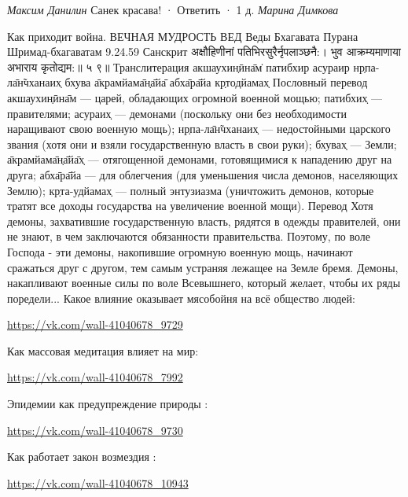 \begin{itemize}
\emph{Максим Данилин}
Санек красава!
 · Ответить · 1 д.
\emph{Марина Димкова}

\obeycr
Как приходит война.
ВЕЧНАЯ МУДРОСТЬ ВЕД
Веды Бхагавата Пурана Шримад-бхагаватам 9.24.59
Санскрит
अक्षौहिणीनां पतिभिरसुरैर्नृपलाञ्छनै:। भुव आक्रम्यमाणाया अभाराय कृतोद्यम:॥ ५ ९॥
Транслитерация
акшаухин̣ӣна̄м̇ патибхир
асураир нр̣па-ла̄н̃чханаих̣
бхува а̄крамйама̄н̣а̄йа̄
абха̄ра̄йа кр̣тодйамах̣
Пословный перевод
акшаухин̣ӣна̄м — царей, обладающих огромной военной мощью; патибхих̣ — правителями; асураих̣ — демонами (поскольку они без необходимости наращивают свою военную мощь); нр̣па-ла̄н̃чханаих̣ — недостойными царского звания (хотя они и взяли государственную власть в свои руки); бхувах̣ — Земли; а̄крамйама̄н̣а̄йа̄х̣ — отягощенной демонами, готовящимися к нападению друг на друга; абха̄ра̄йа — для облегчения (для уменьшения числа демонов, населяющих Землю); кр̣та-удйамах̣ — полный энтузиазма (уничтожить демонов, которые тратят все доходы государства на увеличение военной мощи).
\smallskip
Перевод
\smallskip
Хотя демоны, захватившие государственную власть, рядятся в одежды правителей,
они не знают, в чем заключаются обязанности правительства. Поэтому, по воле
Господа - эти демоны, накопившие огромную военную мощь, начинают сражаться друг
с другом, тем самым устраняя лежащее на Земле бремя.
\smallskip
Демоны, накапливают военные силы по воле Всевышнего, который желает, чтобы их
ряды поредели...
\smallskip
Какое влияние оказывает мясобойня на всё общество людей:
\restorecr

\url{https://vk.com/wall-41040678_9729}

Как массовая медитация влияет на мир:

\url{https://vk.com/wall-41040678_7992}

Эпидемии как предупреждение природы :

\url{https://vk.com/wall-41040678_9730}

Как работает закон возмездия :

\url{https://vk.com/wall-41040678_10943}

\end{itemize} %
